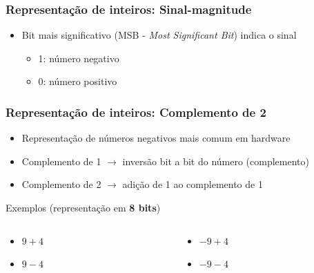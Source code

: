 \documentclass[aspectratio=169,
				xcolor=table]{beamer}
\begin{document}
		\begin{frame}
			\frametitle{Representação de inteiros: Sinal-magnitude}
			\begin{itemize}
				\item Bit mais significativo (MSB - \textit{Most Significant Bit}) indica o sinal
				\begin{itemize}
					\item 1: número negativo
					\item 0: número positivo
				\end{itemize}
			\end{itemize}
		\end{frame}		
	
		\begin{frame}
			\frametitle{Representação de inteiros: Complemento de 2}
			\begin{itemize}
				\item Representação de números negativos mais comum em hardware
				\vspace{0.4em}
				\item Complemento de 1 $\to$ inversão bit a bit do número (complemento)
				\item Complemento de 2 $\to$ adição de 1 ao complemento de 1	
				\vspace{0.3em}
			\end{itemize}
			\begin{exampleblock}{Exemplos (representação em \textbf{8 bits})}
				\begin{columns}
					\begin{column}{0.45\textwidth}
						\begin{itemize}
							\item $9+4$
							\item $9-4$
						\end{itemize}
					\end{column}
					\begin{column}{0.45\textwidth}
						\begin{itemize}
							\item $-9+4$
							\item $-9-4$
						\end{itemize}
					\end{column}
				\end{columns}
			
			\end{exampleblock}
			
		\end{frame}		
		
\end{document}
